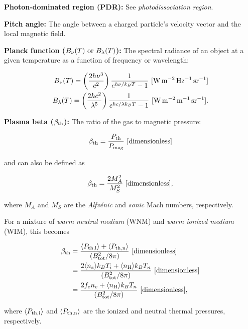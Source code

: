 \documentclass[a4paper,10pt]{article}
\begin{document}
{\noindent}\textbf{Photon-dominated region (PDR):} See \textit{photodissociation region}.

{\noindent}\textbf{Pitch angle:} The angle between a charged particle's velocity vector and the local magnetic field.

{\noindent}\textbf{Planck function ($B_\nu(T)~{\rm or}~B_\lambda(T)$):} The spectral radiance of an object at a given temperature as a function of frequency or wavelength:

\begin{align*}
    B_\nu(T) = \left(\frac{2h\nu^3}{c^2}\right) \frac{1}{e^{h\nu/k_BT}-1} ~ [{\rm W\,m^{-2}\,Hz^{-1}\,sr^{-1}}] \\
    B_\lambda(T) = \left(\frac{2hc^2}{\lambda^5}\right) \frac{1}{e^{hc/\lambda k_BT}-1} ~ [{\rm W\,m^{-2}\,m^{-1}\,sr^{-1}}].
\end{align*}

{\noindent}\textbf{Plasma beta ($\beta_{\rm th}$):} The ratio of the gas to magnetic pressure:

\begin{align*}
    \beta_{\rm th} = \frac{P_{\rm th}}{P_{\rm mag}} ~ [{\rm dimensionless}]
\end{align*}

{\noindent}and can also be defined as

\begin{align*}
    \beta_{\rm th} = \frac{2M_A^2}{M_S^2} ~ [{\rm dimensionless}],
\end{align*}

{\noindent}where $M_A$ and $M_S$ are the \textit{Alfv\'enic} and \textit{sonic} Mach numbers, respectively.

{\noindent}For a mixture of \textit{warm neutral medium} (WNM) and \textit{warm ionized medium} (WIM), this becomes

\begin{align*}
\beta_{\rm th} &= \frac{ \langle P_{\rm th,i}\rangle + \langle P_{\rm th,n}\rangle }{(B_{\rm tot}^2/8\pi)} ~ [{\rm dimensionless}] \\
                      &= \frac{2\langle n_e\rangle k_BT_i + \langle n_{\rm H}\rangle k_BT_n}{(B_{\rm tot}^2/8\pi)}  ~ [{\rm dimensionless}] \\
                      &= \frac{2f_en_e+ \langle n_{\rm H}\rangle k_BT_n}{(B_{\rm tot}^2/8\pi)}  ~ [{\rm dimensionless}],
\end{align*}

{\noindent}where $\langle P_{\rm th,i}\rangle$ and $\langle P_{\rm th,n}\rangle$ are the ionized and neutral thermal pressures, respectively.
\end{document}
